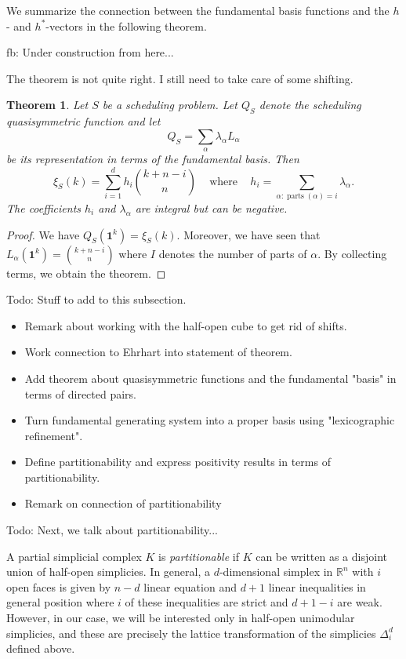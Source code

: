 \documentclass[12pt,reqno]{amsart}
\numberwithin{definition}{section}
\newtheorem{theorem}[definition]{Theorem}
\theoremstyle{definition}
\newcommand{\RR}{\mathbb{R}}
\newcommand{\comment}[1]{\textsf{\footnotesize #1}}
\begin{document}
We summarize the connection between the fundamental basis functions and the $h$- and $h^*$-vectors in the following theorem.

\comment{fb: Under construction from here...}

\comment{The theorem is not quite right. I still need to take care of some shifting.}

\begin{theorem}
Let $S$ be a scheduling problem. Let $Q_S$ denote the scheduling quasisymmetric function and let
\[
  Q_S = \sum_{\alpha} \lambda_\alpha L_\alpha
\]
be its representation in terms of the fundamental basis. Then
\[
  \xi_S(k) = \sum_{i=1}^{d} h_i \binom{k+n-i}{n} \;\;\; \text{ where } \;\;\; h_i = \sum_{\alpha: \operatorname{parts}(\alpha)=i} \lambda_\alpha.
\]
The coefficients $h_i$ and $\lambda_\alpha$ are integral but can be negative.
\end{theorem}

\begin{proof}
We have $Q_S(\mathbf{1}^k)=\xi_S(k)$. Moreover, we have seen that $L_\alpha(\mathbf{1}^k)=\binom{k+n-i}{n}$ where $I$ denotes the number of parts of $\alpha$. By collecting terms, we obtain the theorem.
\end{proof}

\comment{Todo: Stuff to add to this subsection.}

\begin{itemize}
\item Remark about working with the half-open cube to get rid of shifts.
\item Work connection to Ehrhart into statement of theorem.
\item Add theorem about quasisymmetric functions and the fundamental "basis" in terms of directed pairs.
\item Turn fundamental generating system into a proper basis using "lexicographic refinement".
\item Define partitionability and express positivity results in terms of partitionability.
\item Remark on connection of partitionability
\end{itemize}

\comment{Todo: Next, we talk about partitionability...} 

A partial simplicial complex $K$ is \emph{partitionable} if $K$ can be written as a disjoint union of half-open simplicies. In general, a $d$-dimensional simplex in $\RR^n$ with $i$ open faces is given by $n-d$ linear equation and $d+1$ linear inequalities in general position where $i$ of these inequalities are strict and $d+1-i$ are weak. However, in our case, we will be interested only in half-open unimodular simplicies, and these are precisely the lattice transformation of the simplicies $\Delta^d_i$ defined above.
\end{document}
